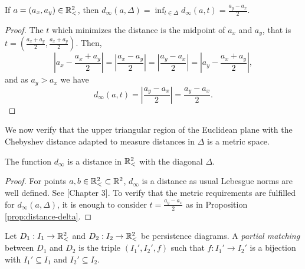 \begin{proposition} \label{prop:distance-delta}
    If $ a = (a_x, a_y) \in \mathbb{R}_<^2 $, then $ d_\infty(a, \Delta) = \inf_{t \in \Delta} d_\infty(a, t) = \frac{a_y - a_x}{2} $.
\end{proposition}
\begin{proof}
    The $ t $ which minimizes the distance is the midpoint of $ a_x $ and $ a_y $, that is $t = \left(\frac{a_x+a_y}{2}, \frac{a_x+a_y}{2}\right)  $. Then,
    \begin{equation}
        \left| a_x - \frac{a_x+a_y}{2} \right| = \left| \frac{a_x-a_y}{2}\right| = \left| \frac{a_y-a_x}{2}\right| = \left| a_y - \frac{a_x+a_y}{2} \right|,
    \end{equation}
    and as $ a_y > a_x $ we have
    \begin{equation}
        d_\infty(a, t) = \left|\frac{a_y - a_x}{2}\right| = \frac{a_y - a_x}{2}.
    \end{equation}
\end{proof}

We now verify that the upper triangular region of the Euclidean plane with the Chebyshev distance adapted to measure distances in $ \Delta $ is a metric space.
\begin{proposition}
    The function $ d_\infty $ is a distance in $ \mathbb{R}_<^2 $ with the diagonal $ \Delta $.
\end{proposition}
\begin{proof}
    For points $ a, b \in \mathbb{R}_<^2 \subset \mathbb R^2 $, $ d_\infty $ is a distance as usual Lebesgue norms are well defined. See \cite{rudin}[Chapter 3]. To verify that the metric requirements are fulfilled for $ d_\infty(a, \Delta) $, it is enough to consider $ t = \frac{a_y - a_x}{2} $ as in Proposition \ref{prop:distance-delta}.
\end{proof}

\begin{definition}
    Let $ D_1: I_1 \to \mathbb{R}_<^2 $ and $ D_2: I_2 \to \mathbb{R}_<^2 $ be persistence diagrams. A {\it partial matching} between $ D_1 $ and $ D_2 $ is the triple $ (I_1', I_2', f) $ such that $ f: I_1' \to I_2' $ is a bijection with $ I_1' \subseteq I_1 $ and $ I_2' \subseteq I_2 $.
\end{definition}

